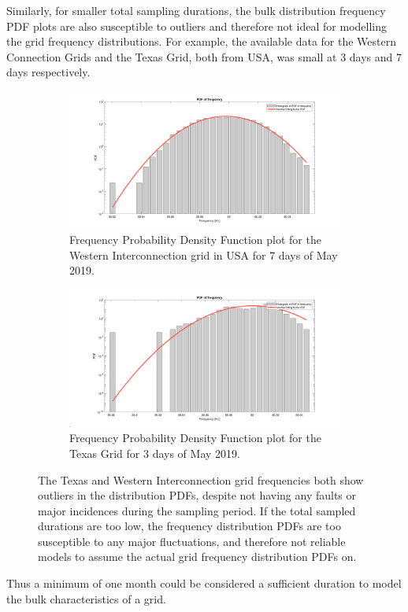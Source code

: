 Similarly, for smaller total sampling durations, the bulk distribution frequency PDF plots are also susceptible to outliers and therefore not ideal for modelling the grid frequency distributions. For example, the available data for the Western Connection Grids and the Texas Grid, both from USA, was small at 3 days and 7 days respectively.

\begin{figure}[!ht]
	\centering
	\begin{subfigure}{\textwidth}
		\centering
		\includegraphics[scale=0.25]{../figures/pdf/pdf_frequency_us_wi_2019_05}
		\caption{Frequency Probability Density Function plot for the Western Interconnection grid in USA for 7 days of May 2019.}
	\end{subfigure}
	
	\begin{subfigure}{\textwidth}
		\centering
		\includegraphics[scale=0.25]{../figures/pdf/pdf_frequency_us_tx_2019_05}
		\caption{Frequency Probability Density Function plot for the Texas Grid for 3 days of May 2019.}
	\end{subfigure}
	\caption{The Texas and Western Interconnection grid frequencies both show outliers in the distribution PDFs, despite not having any faults or major incidences during the sampling period. If the total sampled durations are too low, the frequency distribution PDFs are too susceptible to any major fluctuations, and therefore not reliable models to assume the actual grid frequency distribution PDFs on.}
\end{figure}

Thus a minimum of one month could be considered a sufficient duration to model the bulk characteristics of a grid.